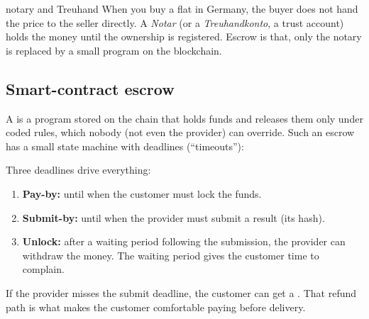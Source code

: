 \begin{analogybox}{notary and Treuhand}
When you buy a flat in Germany, the buyer does not hand the price to the seller directly. A \emph{Notar} (or a \emph{Treuhandkonto}, a trust account) holds the money until the ownership is registered. Escrow is that, only the notary is replaced by a small program on the blockchain.
\end{analogybox}

\subsection{Smart-contract escrow}
A  is a program stored on the chain that holds funds and releases them only under coded rules, which nobody (not even the provider) can override. Such an escrow has a small state machine with deadlines (``timeouts''):

\begin{center}
\end{center}

Three deadlines drive everything:
\begin{enumerate}
  \item \textbf{Pay-by:} until when the customer must lock the funds.
  \item \textbf{Submit-by:} until when the provider must submit a result (its hash).
  \item \textbf{Unlock:} after a waiting period following the submission, the provider can withdraw the money. The waiting period gives the customer time to complain.
\end{enumerate}
If the provider misses the submit deadline, the customer can get a . That refund path is what makes the customer comfortable paying before delivery.

